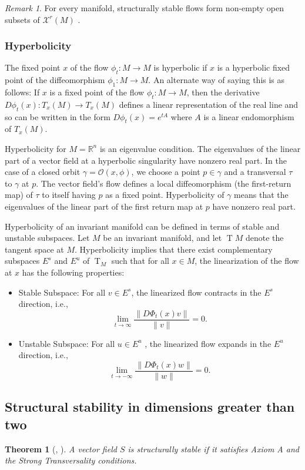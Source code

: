 \documentclass{article}
\newtheorem{theorem}{Theorem}
\theoremstyle{definition}
\theoremstyle{remark}
\newtheorem{remark}{Remark}
\newcommand{\reals}{\mathbb{R}}
\newcommand{\mcX}{\mathcal{X}}
\newcommand{\T}{\operatorname{T}}
\newcommand{\TM}{\T\!M}
\newcounter{ct}
\begin{document}
\begin{remark}
For every manifold, structurally stable flows form non-empty open subsets of $\mcX^r(M)$ \citep{palis1970ss}.
\end{remark}

\subsubsection{Hyperbolicity}
The fixed point $x$ of the flow $\phi_t\colon M\rightarrow M$ is hyperbolic if $x$ is a hyperbolic fixed point of the diffeomorphism $\phi_1: M\rightarrow M$.
 An alternate way of saying this is as follows: If $x$ is a fixed point of the flow $\phi_t\colon M\rightarrow M$, then the derivative $D\phi_t(x)\colon T_x(M)\rightarrow T_x(M)$ defines a linear representation of the real line and so can be written in the form $D\phi_t(x)=e^{tA}$ where $A$ is a linear endomorphism of $T_x(M)$.


Hyperbolicity for $M=\reals^n$ is an eigenvalue condition.
The eigenvalues of the linear part of a vector field at a hyperbolic singularity have nonzero real part.
In the case of a closed orbit $\gamma=\mathcal{O}(x,\phi)$, we choose a point $p\in\gamma$ and a transversal $\tau$ to $\gamma$ at $p$.
The vector field's flow defines a local diffeomorphism (the first-return map) of $\tau$ to itself having $p$ as a fixed point.
Hyperbolicity of $\gamma$ means that the eigenvalues of the linear part of the first return map at $p$ have nonzero real part.
   
Hyperbolicity of an invariant manifold can be defined in terms of stable and unstable subspaces. Let $M$ be an invariant manifold, and let $\TM$  denote the tangent space at $M$. Hyperbolicity implies that there exist complementary subspaces $E^s$  and $E^u$  of $\T_M$  such that for all $x\in M$, the linearization of the flow at $x$ has the following properties:
\begin{itemize}
\item Stable Subspace: For all $v\in E^s$, the linearized flow contracts in the $E^s$  direction, i.e., \[\lim_{t \to \infty} \frac{\|D\Phi_t(x)v\|}{\|v\|} = 0.\]
\item Unstable Subspace: For all $u\in E^u$ , the linearized flow expands in the $E^u$ direction, i.e., \[\lim_{t \to -\infty} \frac{\|D\Phi_t(x)w\|}{\|w\|} = 0.\]
\end{itemize}




\subsection{Structural stability in dimensions greater than two}
\begin{theorem}[\cite{robbin1971ss}, \cite{robinson1974ss}]\label{theorem:ss}
A vector field $S$ is structurally stable if it satisfies Axiom A and the Strong Transversality conditions.
\end{theorem}
\end{document}
